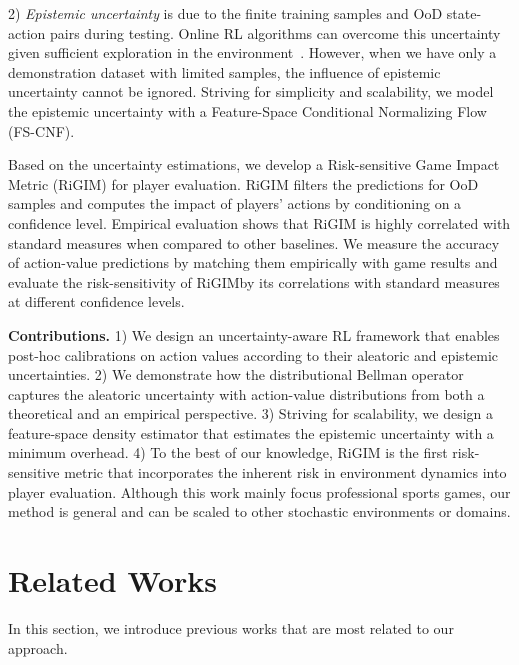 \documentclass{article}
\newcommand{\sys}{RiGIM}
\newcommand{\system}{\sys\;}
\begin{document}
2) {\it Epistemic uncertainty} is due to the finite training samples and OoD state-action pairs during testing. Online RL algorithms can overcome this uncertainty given sufficient exploration in the environment~\cite{Mavrin2019DistributionalRL}. However, when we have only a demonstration dataset with limited samples, the influence of epistemic uncertainty cannot be ignored. Striving for simplicity and scalability, we model the epistemic uncertainty with a Feature-Space Conditional Normalizing Flow (FS-CNF).

Based on the uncertainty estimations, we develop a Risk-sensitive Game Impact Metric (RiGIM) for player evaluation. RiGIM filters the predictions for OoD samples and computes the impact of players' actions by conditioning on a confidence level.
Empirical evaluation shows that RiGIM is highly correlated with standard measures when compared to other baselines. 
We measure the accuracy of action-value predictions by matching them empirically with game results and evaluate the risk-sensitivity of \system by its correlations with standard measures at different confidence levels.

\noindent\textbf{Contributions.} 1) We design an uncertainty-aware RL framework that enables post-hoc calibrations on action values according to their aleatoric and epistemic uncertainties. 2) We demonstrate how the distributional Bellman operator captures the aleatoric uncertainty with action-value distributions from both a theoretical and an empirical perspective. 3) Striving for scalability, we design a feature-space density estimator that estimates the epistemic uncertainty with a minimum overhead. 4) To the best of our knowledge, RiGIM is the first risk-sensitive metric that incorporates the inherent risk in environment dynamics into player evaluation. Although this work mainly focus professional sports games, our method is general and can be scaled to other stochastic environments or domains.

\section{Related Works}
In this section, we introduce previous works that are most related to our approach.
\end{document}
